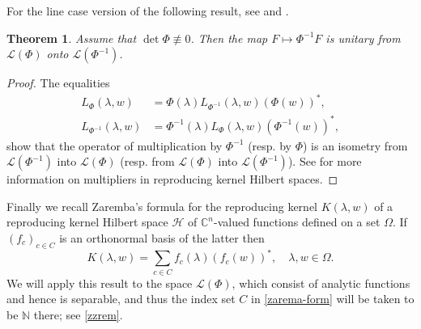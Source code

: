 \documentclass[12pt]{amsart}
\newtheorem{thm}{Theorem}[section]
\theoremstyle{definition}
\theoremstyle{remark}
\numberwithin{equation}{section}
\begin{document}
           For the line case version of the following result, see \cite{dbr1} and \cite{MR2069002}.

            \begin{thm}
Assume that $\det\Phi\not\equiv 0$. Then the map $F\mapsto \Phi^{-1}F$ is unitary from $\mathcal L(\Phi)$ onto $\mathcal L(\Phi^{-1})$.
\end{thm}

\begin{proof}
The equalities
\[
  \begin{split}
    L_{\Phi}({\lambda},w)&=\Phi({\lambda}) L_{\Phi^{-1}}({\lambda},w)(\Phi(w))^*,\\
    L_{\Phi^{-1}}({\lambda},w)&=\Phi^{-1}({\lambda}) L_{\Phi}({\lambda},w)(\Phi^{-1}(w))^*,
    \end{split}
  \]
  show that the operator of multiplication by $\Phi^{-1}$ (resp. by $\Phi$) is an isometry from $\mathcal L(\Phi^{-1})$ into $\mathcal L(\Phi)$
  (resp. from $\mathcal L(\Phi)$ into $\mathcal L(\Phi^{-1})$). See \cite[Exercise 7.6.6 p. 363]{CAPB_2} for more information on multipliers in reproducing kernel
  Hilbert spaces.
   \end{proof}




        Finally we recall Zaremba's formula for the reproducing kernel $K({\lambda},w)$ of a reproducing kernel Hilbert space $\mathcal H$ of $\mathbb C^n$-valued functions
        defined on a set $\Omega$. If $(f_c)_{c\in C}$ is an orthonormal basis of the latter then
        \begin{equation}
K({\lambda},w)=\sum_{c\in C} f_c({\lambda})(f_c(w))^*,\quad {\lambda},w\in\Omega.
\label{zarema-form}
\end{equation}
We will apply this result to the space $\mathcal L(\Phi)$, which consist of analytic functions and hence is separable, and thus the index set $C$ in
\eqref{zarema-form} will be taken to be $\mathbb N$ there; see \eqref{zzrem}.
\end{document}

